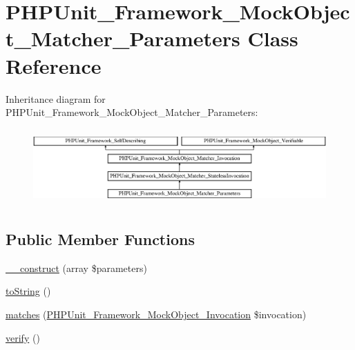 \hypertarget{class_p_h_p_unit___framework___mock_object___matcher___parameters}{}\section{P\+H\+P\+Unit\+\_\+\+Framework\+\_\+\+Mock\+Object\+\_\+\+Matcher\+\_\+\+Parameters Class Reference}
\label{class_p_h_p_unit___framework___mock_object___matcher___parameters}
Inheritance diagram for P\+H\+P\+Unit\+\_\+\+Framework\+\_\+\+Mock\+Object\+\_\+\+Matcher\+\_\+\+Parameters\+:\begin{figure}[H]
\begin{center}
\leavevmode
\includegraphics[height=2.947368cm]{class_p_h_p_unit___framework___mock_object___matcher___parameters}
\end{center}
\end{figure}
\subsection*{Public Member Functions}
\begin{DoxyCompactItemize}
\item 
\mbox{\hyperlink{class_p_h_p_unit___framework___mock_object___matcher___parameters_aa296d9661863e041aa9c31aad768ad8f}{\+\_\+\+\_\+construct}} (array \$parameters)
\item 
\mbox{\hyperlink{class_p_h_p_unit___framework___mock_object___matcher___parameters_a5558c5d549f41597377fa1ea8a1cefa3}{to\+String}} ()
\item 
\mbox{\hyperlink{class_p_h_p_unit___framework___mock_object___matcher___parameters_a4988c6fa11e275302172d0a4ae32dd3a}{matches}} (\mbox{\hyperlink{interface_p_h_p_unit___framework___mock_object___invocation}{P\+H\+P\+Unit\+\_\+\+Framework\+\_\+\+Mock\+Object\+\_\+\+Invocation}} \$invocation)
\item 
\mbox{\hyperlink{class_p_h_p_unit___framework___mock_object___matcher___parameters_aa33600b6a1b28d0c4dfe4d468272aaa4}{verify}} ()
\end{DoxyCompactItemize}
